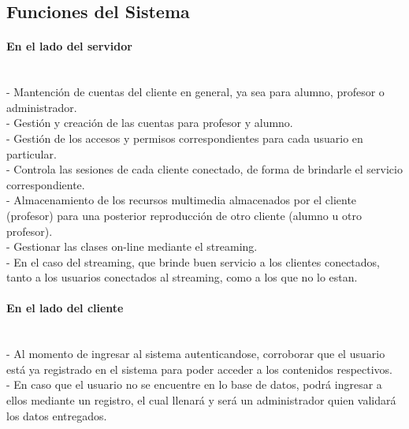 \documentclass[12pt]{article}
\begin{document}
\subsection{Funciones del Sistema}

\paragraph{En el lado del servidor\\\\}

-	Mantención de cuentas del cliente en general, ya sea para alumno, profesor o administrador.\\

-	Gestión y creación de las cuentas para profesor y alumno.\\

-	Gestión de los accesos y permisos correspondientes para cada usuario en particular.\\

-	Controla las sesiones de cada cliente conectado, de forma de brindarle el servicio correspondiente.\\

-	Almacenamiento de los recursos multimedia almacenados por el cliente (profesor) para una posterior
reproducción de otro cliente (alumno u otro profesor).\\

-	Gestionar las clases on-line mediante el streaming.\\

-	En el caso del streaming, que brinde buen servicio a los clientes conectados, tanto a los usuarios
conectados al streaming, como a los que no lo estan.\\

\paragraph{En el lado del cliente\\\\}

-	Al momento de ingresar al sistema autenticandose, corroborar que el usuario está ya registrado en
el sistema para poder acceder a los contenidos respectivos.\\

-	En caso que el usuario no se encuentre en lo base de datos, podrá ingresar a ellos mediante un 
registro, el cual llenará y será un administrador quien validará los datos entregados.\\
\end{document}
